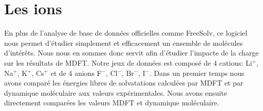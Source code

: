 \section{Les ions}
En plus de l'analyse de base de données officielles comme FreeSolv, ce logiciel nous permet d'étudier simplement et efficacement un ensemble de molécules d’intérêts. Nous nous en sommes donc servit afin d'étudier l'impacte de la charge sur les résultats de MDFT. Notre jeux de données est composé de 4 cations: Li$^+$, Na$^+$, K$^+$, Cs$^+$ et de 4 anions F$^-$, Cl$^-$, Br$^-$, I$^-$.
Dans un premier temps nous avons comparé les énergies libres de solvatations calculées par MDFT et par dynamique moléculaire\cite{Horinek_rational_2009} aux valeurs expérimentales\cite{Marcus_simple_1994, Noyes_thermodynamics_1962}. Nous avons ensuite directement comparées les valeurs MDFT et dynamique moléculaire.



